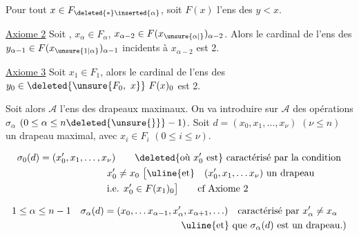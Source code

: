 
 Pour tout $x\in F_{\deleted{*}\inserted{\alpha}}$, soit $F(x)$ l'ens des $y<x$.  

\uline{Axiome 2} Soit , $x_\alpha\in F_\alpha$, $x_{\alpha-2}\in F(x_{\unsure{\alpha|{}}})_{\alpha-2}$. Alors  le cardinal de l'ens des $y_{\alpha-1}\in F(x_{\unsure{1|\alpha}})_{\alpha-1}$ incidents à $x_{\alpha-2}$ est 2.


\uline{Axiome 3} Soit $x_1\in F_1$, alors le cardinal de l'ens des $y_0\in\deleted{\unsure{F_0,\ x}}\ F(x)_0$  est 2.


 Soit alors $\mathcal A$ l'ens des drapeaux maximaux.  On va introduire sur $\mathcal A$ des opérations $\sigma_\alpha$ $(0\leq\alpha\leq n\deleted{\unsure{\}}}-1)$. Soit $d=(x_0,x_1,\ldots,x_\nu)$ $(\nu\leq n)$ un drapeau maximal, avec $x_i\in F_i$ $(0\leq i\leq\nu)$.

\[
\begin{aligned}
\sigma_0(d)&=(x'_0,x_1,\ldots,x_\nu)\qquad\deleted{\text{où }x'_0\text{ est}}\ \text{caractérisé par la condition}\\
&\hspace{7em}x'_0\ne x_0\ \big[\text{\uline{et}}\quad(x'_0,x_1,\ldots x_\nu)\ \text{un drapeau}\\
&\hspace{7em}\text{i.e. }x'_0\in F(x_1)_0\big]\qquad\text{cf Axiome 2}
\end{aligned}
\]

\[
\begin{aligned}
1\leq\alpha\leq n-1\quad \sigma_\alpha(d)&=(x_0,\ldots x_{\alpha-1},x'_\alpha,x_{\alpha+1},\ldots)\quad\text{caractérisé par }x'_\alpha\ne x_\alpha\\
&\hspace{8em}\text{\uline{et}}\ \text{que }\sigma_\alpha(d)\ \text{est un drapeau.})
\end{aligned}
\]

